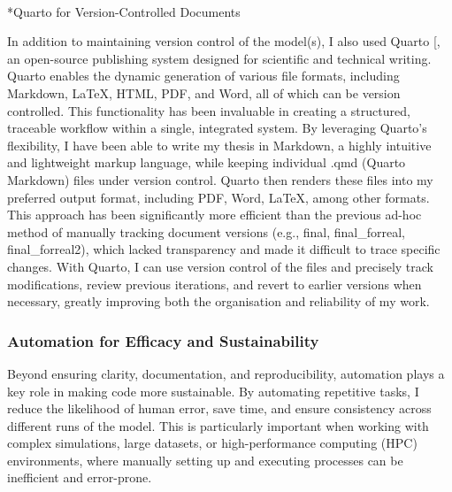 \documentclass[
  11pt,
  letterpaper,
]{scrreprt}
\makeatletter
\let\oldparagraph\paragraph
\renewcommand{\paragraph}{
    \@ifstar
      \xxxParagraphStar
      \xxxParagraphNoStar
  }
\newcommand{\xxxParagraphStar}[1]{\oldparagraph*{#1}\mbox{}}
\newcommand{\xxxParagraphNoStar}[1]{\oldparagraph{#1}\mbox{}}
\makeatother
\begin{document}
\paragraph*{Quarto for Version-Controlled
Documents}\label{quarto-for-version-controlled-documents}

In addition to maintaining version control of the model(s), I also used
Quarto {[}\citeproc{ref-allaire2024Quarto}{397}{]}, an open-source
publishing system designed for scientific and technical writing. Quarto
enables the dynamic generation of various file formats, including
Markdown, LaTeX, HTML, PDF, and Word, all of which can be version
controlled. This functionality has been invaluable in creating a
structured, traceable workflow within a single, integrated system. By
leveraging Quarto's flexibility, I have been able to write my thesis in
Markdown, a highly intuitive and lightweight markup language, while
keeping individual .qmd (Quarto Markdown) files under version control.
Quarto then renders these files into my preferred output format,
including PDF, Word, LaTeX, among other formats. This approach has been
significantly more efficient than the previous ad-hoc method of manually
tracking document versions (e.g., final, final\_forreal,
final\_forreal2), which lacked transparency and made it difficult to
trace specific changes. With Quarto, I can use version control of the
files and precisely track modifications, review previous iterations, and
revert to earlier versions when necessary, greatly improving both the
organisation and reliability of my work.

\subsubsection*{Automation for Efficacy and
Sustainability}\label{automation-for-efficacy-and-sustainability}

Beyond ensuring clarity, documentation, and reproducibility, automation
plays a key role in making code more sustainable. By automating
repetitive tasks, I reduce the likelihood of human error, save time, and
ensure consistency across different runs of the model. This is
particularly important when working with complex simulations, large
datasets, or high-performance computing (HPC) environments, where
manually setting up and executing processes can be inefficient and
error-prone.
\end{document}
